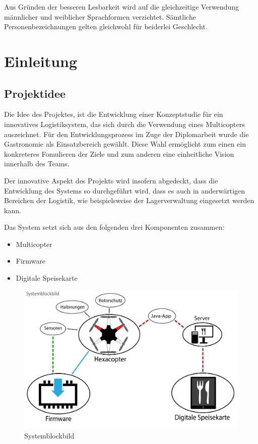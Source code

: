 Aus Gründen der besseren Lesbarkeit wird auf die gleichzeitige Verwendung männlicher und weiblicher Sprachformen verzichtet.
Sämtliche Personenbezeichnungen gelten gleichwohl für beiderlei Geschlecht.

\chapter{Einleitung}
\renewcommand{\kapitelautor}{Autor: Markus Kaiser}

\section{Projektidee}
Die Idee des Projektes, ist die Entwicklung einer Konzeptstudie für ein innovatives Logistiksystem, das sich durch die Verwendung eines Multicopters auszeichnet.
Für den Entwicklungsprozess im Zuge der Diplomarbeit wurde die Gastronomie als Einsatzbereich gewählt. Diese Wahl ermöglicht zum einen
ein konkreteres Fomulieren der Ziele und zum anderen eine einheitliche Vision innerhalb des Teams.

Der innovative Aspekt des Projekts wird insofern abgedeckt, dass die Entwicklung des Systems so durchgeführt wird,
dass es auch in anderwärtigen Bereichen der Logistik, wie beispielsweise der Lagerverwaltung eingesetzt werden kann.

Das System setzt sich aus den folgenden drei Komponenten zusammen:

\begin{itemize}
  \item Multicopter
  \item Firmware
  \item Digitale Speisekarte
\end{itemize}

\begin{figure}[H]
  \begin{centering}
  \includegraphics[width = 1\textwidth]{Bilder/systemblockbild.jpg}
  \par\end{centering}
  \caption{Systemblockbild}
  \label{Systemblockbild}
\end{figure}

